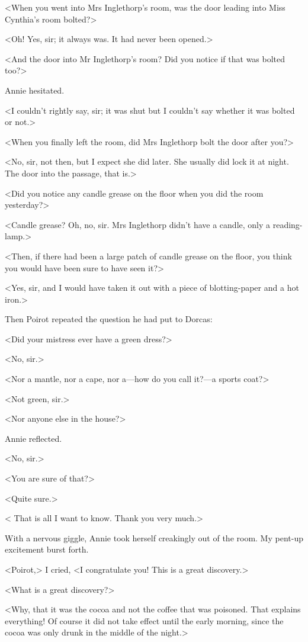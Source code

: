  <When you went into Mrs Inglethorp's room, was the door leading into Miss Cynthia's room bolted?> 

 <Oh! Yes, sir; it always was. It had never been opened.> 

 <And the door into Mr Inglethorp's room? Did you notice if that was bolted too?> 

 Annie hesitated. 

 <I couldn't rightly say, sir; it was shut but I couldn't say whether it was bolted or not.> 

 <When you finally left the room, did Mrs Inglethorp bolt the door after you?> 

 <No, sir, not then, but I expect she did later. She usually did lock it at night. The door into the passage, that is.> 

 <Did you notice any candle grease on the floor when you did the room yesterday?> 

 <Candle grease? Oh, no, sir. Mrs Inglethorp didn't have a candle, only a reading-lamp.> 

 <Then, if there had been a large patch of candle grease on the floor, you think you would have been sure to have seen it?> 

 <Yes, sir, and I would have taken it out with a piece of blotting-paper and a hot iron.> 

 Then Poirot repeated the question he had put to Dorcas: 

 <Did your mistress ever have a green dress?> 

 <No, sir.> 

 <Nor a mantle, nor a cape, nor a—how do you call it?—a sports coat?> 

 <Not green, sir.> 

 <Nor anyone else in the house?> 

 Annie reflected. 

 <No, sir.> 

 <You are sure of that?> 

 <Quite sure.> 

 < That is all I want to know. Thank you very much.> 

 With a nervous giggle, Annie took herself creakingly out of the room. My pent-up excitement burst forth. 

 <Poirot,> I cried, <I congratulate you! This is a great discovery.> 

 <What is a great discovery?> 

 <Why, that it was the cocoa and not the coffee that was poisoned. That explains everything! Of course it did not take effect until the early morning, since the cocoa was only drunk in the middle of the night.> 

